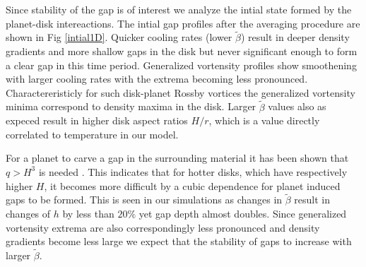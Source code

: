 Since stability of the gap is of interest we analyze the intial state formed by the planet-disk intereactions. The intial gap profiles after the averaging procedure are shown in Fig \ref{intial1D}. Quicker cooling rates (lower $\tilde{\beta}$) result in deeper density gradients and more shallow gaps in the disk but never significant enough to form a clear gap in this time period. Generalized vortensity profiles show smoothening with larger cooling rates with the extrema becoming less pronounced. Charactereristicly for such disk-planet Rossby vortices the generalized vortensity minima correspond to density maxima in the disk. Larger $\tilde\beta$ values also as expeced result in higher disk aspect ratios $H/r$, which is a value directly correlated to temperature in our model.

 For a planet to carve a gap in the surrounding material it has been shown that $q>H^3$ is needed \citep{crida06}. This indicates that for hotter disks, which have respectively higher $H$, it becomes more difficult by a cubic dependence for planet induced gaps to be formed. This is seen in our simulations as changes in $\tilde{\beta}$ result in changes of $h$ by less than $20\%$ yet gap depth almost doubles. Since generalized vortensity extrema are also correspondingly less pronounced and density gradients become less large we expect that the stability of gaps to increase with larger $\tilde{\beta}$.

